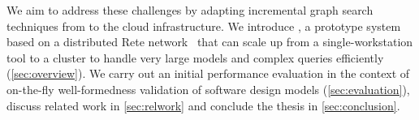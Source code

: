 We aim to address these challenges by adapting incremental graph search techniques from \eiq{} to the cloud infrastructure. We introduce \iqd, a prototype system based on a distributed Rete network~\cite{Forgy} that can scale up from a single-workstation tool to a cluster to handle very large models and complex queries efficiently (\autoref{sec:overview}). We carry out an initial performance evaluation in the context of on-the-fly well-formedness validation of software design models (\autoref{sec:evaluation}), discuss related work in \autoref{sec:relwork} and conclude the thesis in \autoref{sec:conclusion}.


